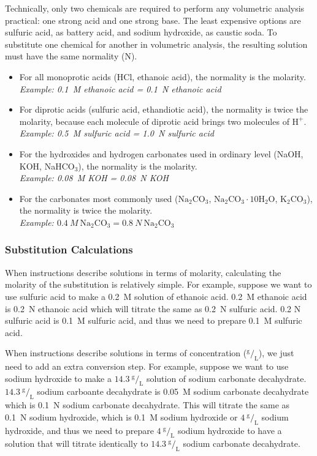 Technically, only two chemicals are required to perform any volumetric analysis practical: one strong acid and one strong base. The least expensive options are sulfuric acid, as battery acid, and sodium hydroxide, as caustic soda. To substitute one chemical for another in volumetric analysis, the resulting solution must have the same normality (N).

\begin{itemize}

\item{For all monoprotic acids (HCl, ethanoic acid), the normality is the molarity.\\
\textit{Example: 0.1~M ethanoic acid = 0.1~N ethanoic acid}}
\item{For diprotic acids (sulfuric acid, ethandiotic acid), the normality is twice the molarity, because each molecule of diprotic acid brings two molecules of $\mathrm{H}^{+}$.\\
\textit{Example: 0.5~M sulfuric acid = 1.0~N sulfuric acid}}
\item{For the hydroxides and hydrogen carbonates used in ordinary level (NaOH, KOH, NaHCO$_{3}$), the normality is the molarity.\\
\textit{Example: 0.08~M KOH = 0.08~N KOH}}
\item{For the carbonates most commonly used ($\mathrm{Na}_2\mathrm{CO}_3$, $\mathrm{Na}_2\mathrm{CO}_3 \cdot 10\mathrm{H}_2\mathrm{O}$, $\mathrm{K}_2\mathrm{CO}_3$), the normality is twice the molarity.\\
\textit{Example: $0.4~M~ \mathrm{Na}_2\mathrm{CO}_3 = 0.8~N~ \mathrm{Na}_2\mathrm{CO}_3$}}

\end{itemize}

\subsubsection{Substitution Calculations}

When instructions describe solutions in terms of molarity, calculating the molarity of the substitution is relatively simple. For example, suppose we want to use sulfuric acid to make a 0.2~M solution of ethanoic acid. 0.2~M ethanoic acid is 0.2~N ethanoic acid which will titrate the same as 0.2~N sulfuric acid. 0.2 N sulfuric acid is 0.1~M sulfuric acid, and thus we need to prepare 0.1~M sulfuric acid.

When instructions describe solutions in terms of concentration ($^\text{g}/_\text{L}$), we just need to add an extra conversion step. For example, suppose we want to use sodium hydroxide to make a $14.3~^\text{g}/_\text{L}$ solution of sodium carbonate decahydrate. $14.3~^\text{g}/_\text{L}$ sodium carboante decahydrate is 0.05~M sodium carbonate decahydrate which is 0.1~N sodium carbonate decahydrate. This will titrate the same as 0.1~N sodium hydroxide, which is 0.1~M sodium hydroxide or $4~^\text{g}/_\text{L}$ sodium hydroxide, and thus we need to prepare $4~^\text{g}/_\text{L}$ sodium hydroxide to have a solution that will titrate identically to $14.3~^\text{g}/_\text{L}$ sodium carbonate decahydrate.

